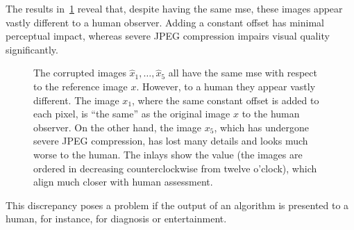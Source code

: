 The results in~\cref{fig:mse doesnt correspond to human visual assessment} reveal that, despite having the same \gls{mse}, these images appear vastly different to a human observer.
Adding a constant offset has minimal perceptual impact, whereas severe JPEG compression impairs visual quality significantly.
\begin{figure}
	\caption[Images on the MSE hypersphere appear vastly different to the human]{%
		The corrupted images \( \hat{x}_{\num{1}},\dotsc,\hat{x}_{\num{5}} \) all have the same \gls{mse} with respect to the reference image \( x \).
		However, to a human they appear vastly different.
		The image \( x_{\num{1}} \), where the same constant offset is added to each pixel, is \enquote{the same} as the original image \( x \) to the human observer.
		On the other hand, the image \( x_{\num{5}} \), which has undergone severe JPEG compression, has lost many details and looks much worse to the human.
		The inlays show the  value (the images are ordered in decreasing  counterclockwise from twelve o'clock), which align much closer with human assessment.
	}%
	\label{fig:mse doesnt correspond to human visual assessment}
\end{figure}
This discrepancy poses a problem if the output of an algorithm is presented to a human, for instance, for diagnosis or entertainment.

